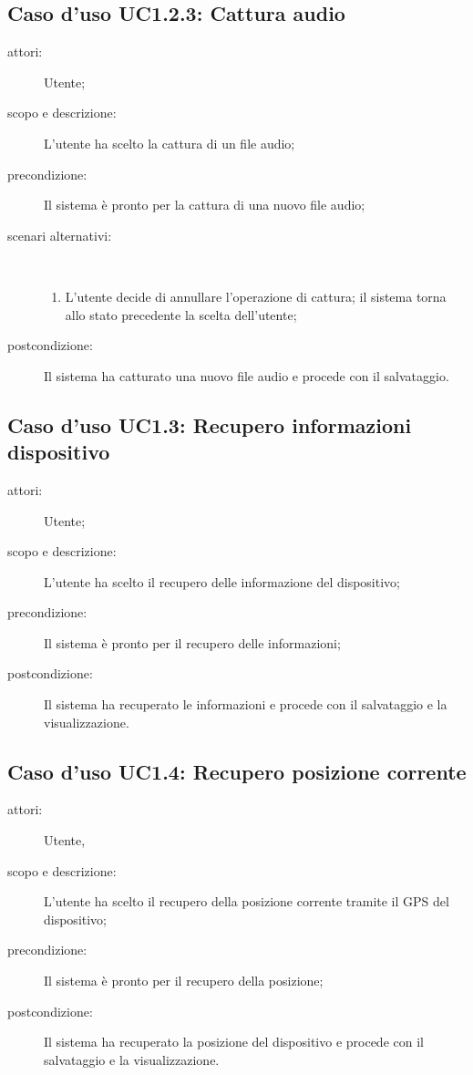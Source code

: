 \subsection{Caso d'uso UC1.2.3: Cattura audio}
\begin{description}
\item[attori:] Utente;
\item[scopo e descrizione:] L'utente ha scelto la cattura di un file audio;
\item[precondizione:] Il sistema è pronto per la cattura di una nuovo file audio;
\item[scenari alternativi:] \hfill \\
	\begin{enumerate}
	\item L'utente decide di annullare l'operazione di cattura; il sistema torna allo stato precedente la scelta dell'utente;
	\end{enumerate}
\item[postcondizione:] Il sistema ha catturato una nuovo file audio e procede con il salvataggio.
\end{description}

\subsection{Caso d'uso UC1.3: Recupero informazioni dispositivo}
\begin{description}
\item[attori:] Utente;
\item[scopo e descrizione:] L'utente ha scelto il recupero delle informazione del dispositivo;
\item[precondizione:] Il sistema è pronto per il recupero delle informazioni;
\item[postcondizione:] Il sistema ha recuperato le informazioni e procede con il salvataggio e la visualizzazione.
\end{description}

\subsection{Caso d'uso UC1.4: Recupero posizione corrente}
\begin{description}
\item[attori:] Utente,
\item[scopo e descrizione:] L'utente ha scelto il recupero della posizione corrente tramite il \ac{GPS} del dispositivo;
\item[precondizione:] Il sistema è pronto per il recupero della posizione;
\item[postcondizione:] Il sistema ha recuperato la posizione del dispositivo e procede con il salvataggio e la visualizzazione.
\end{description}

